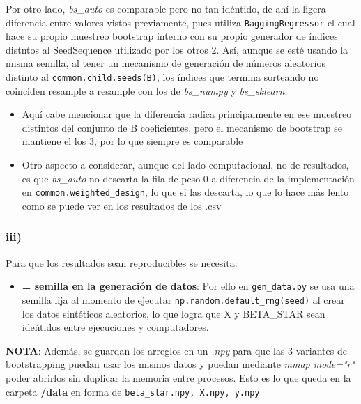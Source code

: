 \documentclass[11pt]{article}
\begin{document}
Por otro lado, \textit{bs\_auto} es comparable pero no tan id\'entido, de ah\'i la ligera diferencia entre valores vistos previamente, pues utiliza \texttt{BaggingRegressor} el cual hace su propio muestreo bootstrap interno con su propio generador de \'indices distntos al SeedSequence utilizado por los otros 2. As\'i, aunque se est\'e usando la misma semilla, al tener un mecanismo de generaci\'on de n\'umeros aleatorios distinto al \texttt{common.child.seeds(B)}, los \'indices que termina sorteando no coinciden resample a resample con los de \textit{bs\_numpy} y \textit{bs\_sklearn}.
\begin{itemize}
  \item Aqu\'i cabe mencionar que la diferencia radica principalmente en ese muestreo distintos del conjunto de B coeficientes, pero el mecanismo de bootstrap se mantiene el los 3, por lo que siempre es comparable
  \item Otro aspecto a considerar, aunque del lado computacional, no de resultados, es que \textit{bs\_auto} no descarta la fila de peso 0 a diferencia de la implementaci\'on en \texttt{common.weighted\_design}, lo que si las descarta, lo que lo hace m\'as lento como se puede ver en los resultados de los .csv
\end{itemize}

\subsubsection*{iii)}

Para que los resultados sean reproducibles se necesita:
\begin{itemize}
  \item \textbf{= semilla en la generaci\'on de datos}: Por ello en \texttt{gen\_data.py} se usa una semilla fija al momento de ejecutar \texttt{np.random.default\_rng(seed)} al crear los datos sint\'eticos aleatorios, lo que logra que X y BETA\_STAR sean ide\'ntidos entre ejecuciones y computadores.
\end{itemize}

\textbf{NOTA}: Adem\'as, se guardan los arreglos en un \textit{.npy} para que las 3 variantes de bootstrapping puedan usar los mismos datos y puedan mediante \textit{mmap mode="r"} poder abrirlos sin duplicar la memoria entre procesos. Esto es lo que queda en la carpeta \textbf{/data} en forma de \texttt{beta\_star.npy, X.npy, y.npy}
\end{document}
